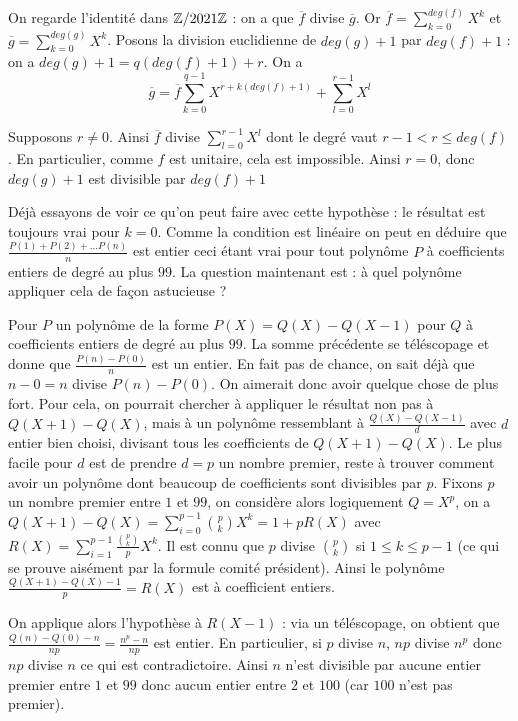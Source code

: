 \begin{sol}
On regarde l'identité dans $\mathbb Z/2021\mathbb Z$ : on a que $\overline{f}$ divise $\overline{g}$. Or $\overline{f}=\sum\limits_{k=0}^{deg(f)}X^k$ et $\overline{g}=\sum\limits_{k=0}^{deg(g)}X^k$.
Posons la division euclidienne de $deg(g) + 1$ par $deg(f) + 1$ : on a $deg(g) + 1=q(deg(f) + 1) + r$. On a $$\overline{g}=\overline{f}\sum\limits_{k=0}^{q - 1}X^{r + k(deg(f) + 1)} + \sum\limits_{l=0}^{r - 1}X^l$$

Supposons $r\neq 0$. Ainsi $\overline{f}$ divise $\sum\limits_{l=0}^{r - 1}X^l$ dont le degré vaut $r - 1<r\leq deg(f)$. En particulier, comme $f$ est unitaire, cela est impossible. Ainsi $r=0$, donc $deg(g) + 1$ est divisible par $deg(f) + 1$
\end{sol}

\begin{sol}
Déjà essayons de voir ce qu'on peut faire avec cette hypothèse : le résultat est toujours vrai pour $k=0$. Comme la condition est linéaire on peut en déduire que $\frac{P(1) + P(2) + \dots P(n)}{n}$ est entier
ceci étant vrai pour tout polynôme $P$ à coefficients entiers de degré au plus $99$. La question maintenant est : à quel polynôme appliquer cela de façon astucieuse ?

Pour $P$ un polynôme de la forme $P(X)=Q(X) - Q(X - 1)$ pour $Q$ à coefficients entiers de degré au plus $99$. La somme précédente se téléscopage et donne que $\frac{P(n) - P(0)}{n}$ est un entier. En fait pas de chance, on sait déjà que $n - 0=n$ divise $P(n) - P(0)$. On aimerait donc avoir quelque chose de plus fort. Pour cela, on pourrait chercher à appliquer le résultat non pas à $Q(X + 1) - Q(X)$, mais à un polynôme ressemblant à $\frac{Q(X) - Q(X - 1)}{d}$ avec $d$ entier bien choisi, divisant tous les coefficients de $Q(X + 1) - Q(X)$. Le plus facile pour $d$ est de prendre $d=p$ un nombre premier, reste à trouver comment avoir un polynôme dont beaucoup de coefficients sont divisibles par $p$. Fixons $p$ un nombre premier entre $1$ et $99$, on considère alors logiquement $Q=X^p$, on a $Q(X + 1) - Q(X)=\sum \limits_{i=0}^{p - 1}\binom{p}{k}X^k=1 + pR(X)$ avec $R(X)=\sum \limits_{i=1}^{p - 1}\frac{\binom{p}{k}}{p}X^k$. Il est connu que $p$ divise $\binom{p}{k}$ si $1\leq k \leq p - 1$ (ce qui se prouve aisément par la formule comité président). Ainsi le polynôme $\frac{Q(X + 1) - Q(X) - 1}{p}=R(X)$ est à coefficient entiers.

On applique alors l'hypothèse à $R(X - 1)$ : via un téléscopage, on obtient que $\frac{Q(n) - Q(0) - n}{np}=\frac{n^p - n}{np}$ est entier. En particulier, si $p$ divise $n$, $np$ divise $n^p$ donc $np$ divise $n$ ce qui est contradictoire. Ainsi $n$ n'est divisible par aucune entier premier entre $1$ et $99$ donc aucun entier entre $2$ et $100$ (car $100$ n'est pas premier).
\end{sol}

